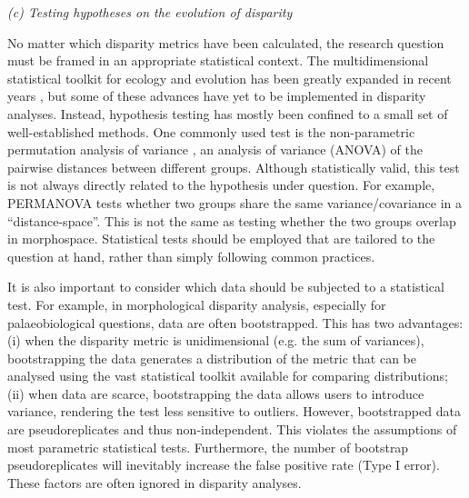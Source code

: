 \documentclass[12pt,letterpaper]{article}
\renewcommand{\subsection}[1]{%
\bigskip
\begin{center}
\begin{large}
\normalfont\itshape #1
\end{large}
\end{center}}
\begin{document}
\subsection{(c) Testing hypotheses on the evolution of
disparity}

No matter which disparity metrics have been calculated, the research question must be framed in an appropriate statistical context.
The multidimensional statistical toolkit for ecology and evolution has been greatly expanded in recent years \citep{Adams2018-mg}
, but some of these advances have yet to be implemented in disparity analyses. Instead, hypothesis testing has mostly been confined to a small set of well-established methods.
One commonly used test is the non-parametric permutation analysis of variance \citep{Anderson2001-qb, Anderson2013-zt}, an analysis of variance (ANOVA) of the pairwise distances between different groups.
Although statistically valid, this test is not always directly related to the hypothesis under question.
For example, PERMANOVA tests whether two groups share the same variance/covariance in a ``distance-space''.
This is not the same as testing whether the two groups overlap in morphospace.
Statistical tests should be employed that are tailored to the question at hand, rather than simply following common practices.

It is also important to consider which data should be subjected to a statistical test.
For example, in morphological disparity analysis, especially for palaeobiological questions, data are often bootstrapped.
This has two advantages: (i) when the disparity metric is unidimensional (e.g. the sum of variances), bootstrapping the data generates a distribution of the metric that can be analysed using the vast statistical toolkit available for comparing distributions; (ii) when data are scarce, bootstrapping the data allows users to introduce variance, rendering the test less sensitive to outliers.
However, bootstrapped data are pseudoreplicates and thus non-independent.
This violates the assumptions of most parametric statistical tests.
Furthermore, the number of bootstrap pseudoreplicates will inevitably increase the false positive rate (Type I error).
These factors are often ignored in disparity analyses.
\end{document}
